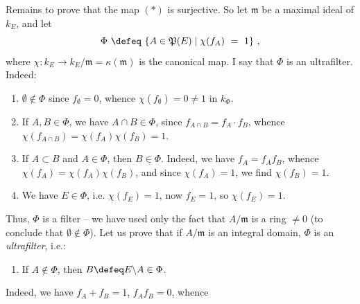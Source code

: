 \noindent Remains to prove that the map $(*)$ is surjective. So let $\mathfrak{m}$ be a maximal ideal of $k_E$, and let
\[
\Phi \ \defeq \ \{A\in\mathfrak{P}(E)\mid\chi(f_A) \ = \ 1\} \ ,
\]
where $\chi : k_E\longrightarrow k_E/\mathfrak{m}=\kappa(\mathfrak{m})$ is the canonical map. I say that $\Phi$ is an ultrafilter. Indeed:
\begin{enumerate}
\item[a)] $\emptyset\notin\Phi$ since $f_\emptyset=0$, whence $\chi(f_\emptyset)=0\neq1$ in $k_\Phi$.
\item[b)] If $A,B\in\Phi$, we have $A\cap B\in\Phi$, since $f_{A\cap B}=f_A\cdot f_B$, whence $\chi(f_{A\cap B})=\chi(f_A)\chi(f_B)=1$.
\item[c)] If $A\subset B$ and $A\in\Phi$, then $B\in\Phi$. Indeed, we have $f_A=f_Af_B$, whence $\chi(f_A)=\chi(f_A)\chi(f_B)$, and since $\chi(f_A)=1$, we find $\chi(f_B)=1$.
\item[d)] We have $E\in\Phi$, i.e. $\chi(f_E)=1$, now $f_E=1$, so $\chi(f_E)=1$.
\end{enumerate}
Thus, $\Phi$ is a filter -- we have used only the fact that $A/\mathfrak{m}$ is a ring $\neq0$ (to conclude that $\emptyset\notin\Phi$). Let us prove that if $A/\mathfrak{m}$ is an integral domain, $\Phi$ is an \textit{ultrafilter}, i.e.:
\begin{enumerate}
\item[e)] If $A\notin\Phi$, then $B\defeq E\backslash A\in\Phi$.
\end{enumerate}
Indeed, we have $f_A+f_B=1$, $f_Af_B=0$, whence